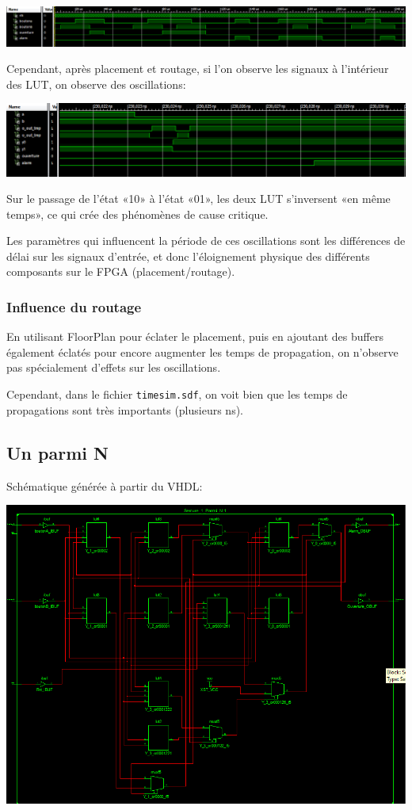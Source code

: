 \documentclass{article}
\begin{document}
\includegraphics[width=\linewidth]{Serrure_Assynchrone_Testbench.png}


Cependant, après placement et routage, si l’on observe les signaux à l’intérieur des LUT, on observe des oscillations:

\includegraphics[width=\linewidth]{Serrure_Assynchrone_Oscillations.png}


Sur le passage de l’état «10» à l’état «01», les deux LUT s’inversent «en même temps», ce qui crée des phénomènes de cause critique.

Les paramètres qui influencent la période de ces oscillations sont les différences de délai sur les signaux d’entrée, et donc l’éloignement physique des différents composants sur le FPGA (placement/routage).
\subsubsection{Influence du routage}

En utilisant FloorPlan pour éclater le placement, puis en ajoutant des buffers également éclatés pour encore augmenter les temps de propagation, on n’observe pas spécialement d’effets sur les oscillations.



Cependant, dans le fichier \verb|timesim.sdf|, on voit bien que les temps de propagations sont très importants (plusieurs ns).
\subsection{Un parmi N}

Schématique générée à partir du VHDL:

\includegraphics[width=\linewidth]{Serrure_1_Parmi_N_Sch.png}
\end{document}
